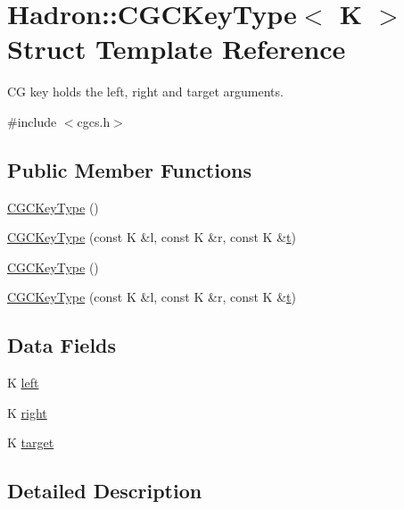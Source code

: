 \hypertarget{structHadron_1_1CGCKeyType}{}\section{Hadron\+:\+:C\+G\+C\+Key\+Type$<$ K $>$ Struct Template Reference}
\label{structHadron_1_1CGCKeyType}


CG key holds the left, right and target arguments.  




{\ttfamily \#include $<$cgcs.\+h$>$}

\subsection*{Public Member Functions}
\begin{DoxyCompactItemize}
\item 
\mbox{\hyperlink{structHadron_1_1CGCKeyType_ae62b61c0cdc189bbdc1fb9c64780f03a}{C\+G\+C\+Key\+Type}} ()
\item 
\mbox{\hyperlink{structHadron_1_1CGCKeyType_a0547a9be19cf1cc084477d2eb8ee5d98}{C\+G\+C\+Key\+Type}} (const K \&l, const K \&r, const K \&\mbox{\hyperlink{hadron__timeslice_8cc_ac310d9181e916ba43604099aee272c71}{t}})
\item 
\mbox{\hyperlink{structHadron_1_1CGCKeyType_ae62b61c0cdc189bbdc1fb9c64780f03a}{C\+G\+C\+Key\+Type}} ()
\item 
\mbox{\hyperlink{structHadron_1_1CGCKeyType_a0547a9be19cf1cc084477d2eb8ee5d98}{C\+G\+C\+Key\+Type}} (const K \&l, const K \&r, const K \&\mbox{\hyperlink{hadron__timeslice_8cc_ac310d9181e916ba43604099aee272c71}{t}})
\end{DoxyCompactItemize}
\subsection*{Data Fields}
\begin{DoxyCompactItemize}
\item 
K \mbox{\hyperlink{structHadron_1_1CGCKeyType_a3b226cbdc5e984aebb5bffbab67bf3d3}{left}}
\item 
K \mbox{\hyperlink{structHadron_1_1CGCKeyType_a4d75dc8807294fd99260f8ac1baedee3}{right}}
\item 
K \mbox{\hyperlink{structHadron_1_1CGCKeyType_a6e142be2aca9c37be703a19a06c31700}{target}}
\end{DoxyCompactItemize}


\subsection{Detailed Description}
